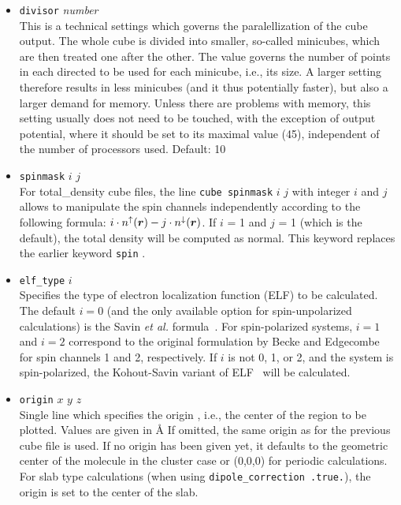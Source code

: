 \begin{itemize}
\item {} \texttt{divisor} \textit{number} \\
This is a technical settings which governs the paralellization of the
cube output. The whole cube is divided into smaller, so-called minicubes,
which are then treated one after the other. The value governs the number of points in each
directed to be used for each minicube, i.e., its size. A larger setting therefore results
in less minicubes (and it thus potentially faster), but also a larger demand for memory.
Unless there are problems with memory, this setting usually does not
need to be touched, with the exception of output potential, where it
should be set to its maximal value (45), independent of the number of
processors used. Default: 10

\item {} \texttt{spinmask} $i$ $j$ \\
For total\_density cube files, the line \texttt{cube spinmask}
    $i$ $j$ with integer $i$ and $j$ allows to manipulate the spin channels
    independently according to the following formula: $i\cdot n^\uparrow(\mbox{\boldmath$r$})
    - j\cdot n^\downarrow(\mbox{\boldmath$r$})$. If $i$ = 1 and $j$ = 1 (which is the default),
    the total density will be computed as normal.
    This keyword replaces the earlier keyword  \texttt{spin} .

\item {} \texttt{elf\_type} $i$ \\
Specifies the type of electron localization function (ELF) to be calculated.
The default $i=0$ (and the only available option for spin-unpolarized calculations)
is the Savin {\em et al.} formula~\cite{Savin96}. For spin-polarized systems,
$i=1$ and $i=2$ correspond to the original formulation by
Becke and Edgecombe~\cite{Becke90} for spin channels 1 and 2, respectively.
If $i$ is not 0, 1, or 2, and the system is spin-polarized,
the Kohout-Savin variant of ELF~\cite{Kohout96} will be calculated.

\item {} \texttt{origin} $x$ $y$ $z$ \\
Single line which specifies the origin , i.e., the center of the region to be plotted. Values are given in \AA
If omitted, the same origin as for the previous cube file is used. If
no origin has been given yet, it defaults to the geometric center of
the molecule in the cluster case or (0,0,0) for periodic
calculations. For slab type calculations (when using
\texttt{dipole\_correction .true.}), the origin is set to the center
of the slab.


\end{itemize}

